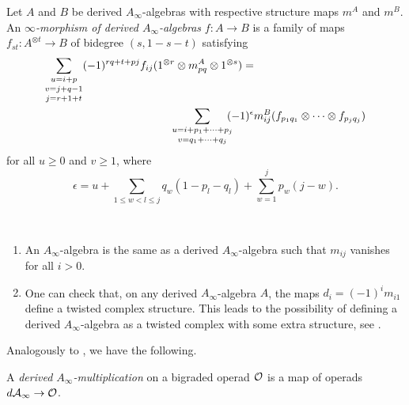 \documentclass[Thesis.tex]{subfiles}
\begin{document}
\pagebreak
\begin{defin}
Let $A$ and $B$ be derived $A_\infty$-algebras with respective structure maps $m^A$ and $m^B$. An \emph{$\infty$-morphism of derived $A_\infty$-algebras} $f:A\to B$ is a family of maps $f_{st}:A^{\otimes t}\to B$ of bidegree $(s,1-s-t)$ satisfying
\begin{align}\label{dinftymaps}
\underset{j=r+1+t}{\underset{v=j+q-1}{\sum_{u=i+p}}}(-1)^{rq+t+pj}f_{ij}(1^{\otimes r}\otimes m_{pq}^A\otimes 1^{\otimes s})=&\\
\underset{v=q_1+\cdots +q_j}{\sum_{\mathclap{u=i+p_1+\cdots +p_j}}}(-1)^{\epsilon} & m^B_{ij}(f_{p_1 q_1}\otimes\cdots\otimes f_{p_j q_j})\nonumber
\end{align}
for all $u\geq 0$ and $v\geq 1$, where
\[\epsilon = u +\sum_{1\leq w < l \leq j} q_w(1-p_l-q_l)  + \sum_{w=1}^j p_w(j-w).\]
\end{defin}
\begin{ex}\
\begin{enumerate}
\item An $A_\infty$-algebra is the same as a derived $A_\infty$-algebra such that $m_{ij}$ vanishes for all $i>0$.
\item One can check that, on any derived $A_\infty$-algebra $A$, the maps $d_i=(-1)^{i}m_{i1}$ define a twisted complex structure. This leads to the possibility of defining a derived $A_\infty$-algebra as a twisted complex with some extra structure, see .

\end{enumerate}
\end{ex}


Analogously to , we have the following.

\begin{defin}\label{derivedmultiplication}
A \emph{derived $A_\infty$-multiplication} on a bigraded operad ${\mathcal O}$ is a map of operads $d\mathcal{A}_\infty\to{\mathcal O}$.
\end{defin}
\end{document}
